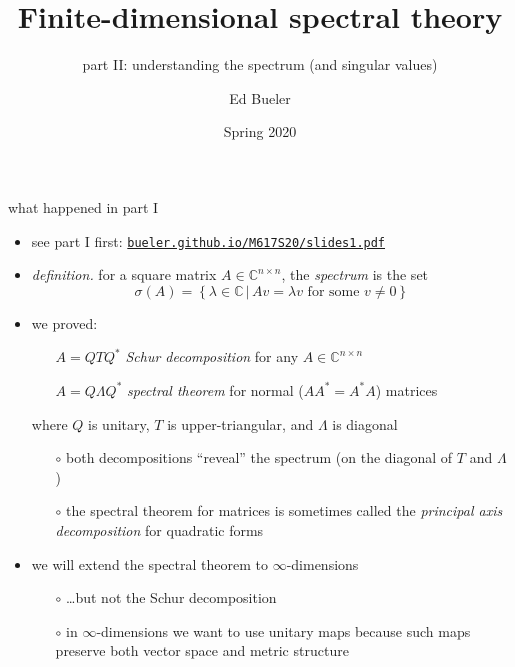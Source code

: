 \documentclass[10pt,hyperref]{beamer}
\title[Finite-dimensional spectral theory II]{Finite-dimensional spectral theory}
\subtitle{part II: understanding the spectrum (and singular values)}
\author{Ed Bueler}
\institute[MATH 617]{MATH 617 Functional Analysis}
\date{Spring 2020}
\newcommand{\CC}{\mathbb{C}}
\begin{document}
\beamertemplatenavigationsymbolsempty


\begin{frame}
  \maketitle
\end{frame}


\begin{frame}{what happened in part I}

\begin{itemize}
\item see part I first: \quad \href{http://bueler.github.io/M617S20/slides1.pdf}{\texttt{bueler.github.io/M617S20/slides1.pdf}}
\item \emph{definition.} for a square matrix $A\in\CC^{n\times n}$, the \emph{spectrum} is the set
    $$\sigma(A)=\left\{\lambda\in\CC\,\big|\,Av=\lambda v \text{ for some }v\ne 0\right\}$$
\item we proved:
    \begin{itemize}
    \item[] $A = Q T Q^*$ \quad \emph{Schur decomposition} \quad for any $A \in \CC^{n\times n}$
    \item[] $A = Q \Lambda Q^*$ \quad \emph{spectral theorem} \quad for normal ($AA^*=A^*A$) matrices
    \end{itemize}
where $Q$ is unitary, $T$ is upper-triangular, and $\Lambda$ is diagonal
    \begin{itemize}
    \item[$\circ$] both decompositions ``reveal'' the spectrum (on the diagonal of $T$ and $\Lambda$)
    \item[$\circ$] the spectral theorem for matrices is sometimes called the \emph{principal axis decomposition} for quadratic forms
    \end{itemize}
\item we will extend the spectral theorem to $\infty$-dimensions
    \begin{itemize}
    \item[$\circ$] \dots but not the Schur decomposition
    \item[$\circ$] in $\infty$-dimensions we want to use unitary maps because such maps preserve both vector space and metric structure
    \end{itemize}
\end{itemize}
\end{frame}


\end{document}
